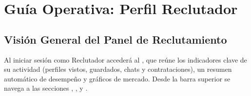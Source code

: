 \chapter{Guía Operativa: Perfil Reclutador}
\label{ch:reclutador}

\section{Visión General del Panel de Reclutamiento}
\label{sec:rec-dashboard}
Al iniciar sesión como Reclutador accederá al , que reúne los
indicadores clave de su actividad (perfiles vistos, guardados, chats y contrataciones),
un resumen automático de desempeño y gráficos de mercado. Desde la barra superior se
navega a las secciones , ,  y
.

